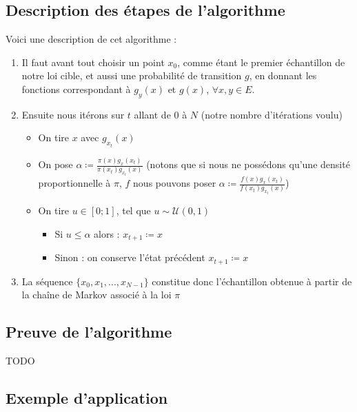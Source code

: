 \documentclass{article}
\begin{document}
\subsection{Description des étapes de l'algorithme}

Voici une description de cet algorithme :

\begin{enumerate}
\item Il faut avant tout choisir un point $x_0$, comme étant le premier échantillon de notre loi cible, et aussi une probabilité de transition $g$, en donnant les fonctions correspondant à $g_y(x)$ et $g(x)$, $\forall x,y \in E$.  

\item Ensuite nous itérons sur $t$ allant de 0 à $N$ (notre nombre d'itérations voulu)  \begin{itemize}
    \item On tire $x$ avec $g_{x_t}(x)$  
    \item On pose $\alpha \coloneqq \frac{ \pi(x) g_x(x_t)}{\pi(x_t) g_{x_t}(x)}$ (notons que si nous ne possédons qu'une densité proportionnelle à $\pi$, $f$ nous pouvons poser $\alpha \coloneqq \frac{ f(x) g_x(x_t)}{f(x_t) g_{x_t}(x)}$)  
    \item On tire $u \in [0;1]$, tel que $u  \sim \mathcal{U}(0,1)$  \begin{itemize}
        \item Si $u \leqslant \alpha$ alors : $x_{t+1} \coloneqq x$  
        \item Sinon : on conserve l'état précédent $x_{t+1} \coloneqq x$  
        \end{itemize}
    \end{itemize}
\item La séquence $\{x_0,x_1, ... ,x_{N-1}\}$ constitue donc l'échantillon obtenue à partir de la chaîne de Markov associé à la loi $\pi$
\end{enumerate}

\subsection{Preuve de l'algorithme}

TODO \\

\subsection{Exemple d'application}
\end{document}
